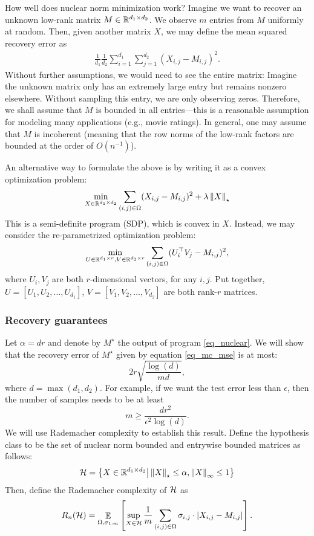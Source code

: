 {How well does nuclear norm minimization work?}
Imagine we want to recover an unknown low-rank matrix $M \in \mathbb{R}^{d_1 \times d_2}$.
We observe $m$ entries from $M$ uniformly at random.
Then, given another matrix $X$, we may define the mean squared recovery error as
\begin{align}
    \frac 1 {d_1} \frac 1 {d_2} \sum_{i=1}^{d_1} \sum_{j=1}^{d_2} (X_{i, j} - M_{i, j})^2. \label{eq_mc_mse}
\end{align}
Without further assumptions, we would need to see the entire matrix:
Imagine the unknown matrix only has an extremely large entry but remains nonzero elsewhere.
Without sampling this entry, we are only observing zeros.
Therefore, we shall assume that $M$ is bounded in all entries---this is a reasonable assumption for modeling many applications (e.g., movie ratings).
In general, one may assume that $M$ is incoherent (meaning that the row norms of the low-rank factors are bounded at the order of $O(n^{-1})$).

\begin{remark}
    An alternative way to formulate the above is by writing it as a convex optimization problem:
    \[ \min_{X \in \mathbb{R}^{d_1 \times d_2}} \sum_{(i, j) \in \Omega} (X_{i, j} - M_{i, j})^2 + \lambda \left\| X \right\|_{\star} \]
    This is a semi-definite program (SDP), which is convex in $X$.
    Instead, we may consider the re-parametrized optimization problem:
    \[ \min_{U\in\mathbb{R}^{d_1\times r}, V\in\mathbb{R}^{d_2 \times r}} \sum_{(i, j) \in \Omega} (U_i^{\top} V_j - M_{i, j})^2, \]
    where $U_i, V_j$ are both $r$-dimensional vectors, for any $i, j$.
    Put together, $U = [U_1, U_2, \dots, U_{d_1}]$, $V = [V_1, V_2, \dots, V_{d_2}]$ are both rank-$r$ matrices.
\end{remark}

\subsubsection{Recovery guarantees}

Let $\alpha = d r$ and denote by $M^{\star}$ the output of program \eqref{eq_nuclear}.
We will show that the recovery error of $M^{\star}$ given by equation \eqref{eq_mc_mse} is at most:
\[ 2r \sqrt{\frac {\log (d)} {m d}}, \]
where $d = \max(d_1, d_2)$.
For example, if we want the test error less than $\epsilon$, then the number of samples needs to be at least
\[ m \ge \frac {d r^2} { \epsilon^2 \log (d) }. \]
We will use Rademacher complexity to establish this result. %
Define the hypothesis class to be the set of nuclear norm bounded and entrywise bounded matrices as follows:
\[ \mathcal{H} = \big\{  X \in \mathbb{R}^{d_1 \times d_2} \big| \left\| X \right\|_{\star} \le \alpha, \left\| X \right\|_{\infty} \le 1 \big\} \]
Then, define the Rademacher complexity of $\mathcal{H}$ as
\[ R_n(\mathcal{H}) = \mathop{\mathbb{E}}_{\Omega, \sigma_{1:m}}\left[ \sup_{X\in\mathcal{H}} \frac 1 m \sum_{(i, j) \in \Omega}  \sigma_{i, j} \cdot {\left| {X_{i, j} - M_{i, j}} \right|} \right]. \]

